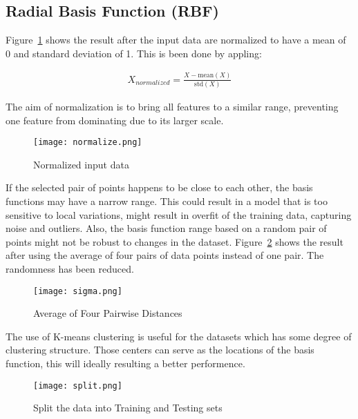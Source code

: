 \documentclass[10pt]{article}
\newcommand{\figsquish}{\vspace{-5mm}} %
\begin{document}
\begin{multicols*}{2}

\section{Radial Basis Function (RBF)}

Figure~\ref*{fig:normalize} shows the result after the input data are normalized to have a mean of 0 and standard deviation of 1.
This is been done by appling: 

\figsquish
\begin{gather*}
    X_{normalized} = \frac{X-\mathrm{mean} (X )}{\mathrm{std} (X)} 
\end{gather*}

The aim of normalization is to bring all features to a similar range, preventing one feature from dominating due to its larger scale. 

\figsquish
\begin{figure}[H]
    \centering
    \texttt{[image: normalize.png]}
    \caption{Normalized input data}
    \label{fig:normalize}
\end{figure}

If the selected pair of points happens to be close to each other, the basis functions may have a narrow range. This could result in a model that is too sensitive to local variations, might result in overfit of the training data,
capturing noise and outliers. 
Also, the basis function range based on a random pair of points might not be robust to changes in the dataset.
Figure~\ref*{fig:sigma} shows the result after using the average of four pairs of data points instead of one pair. The randomness has been reduced. 

\figsquish
\begin{figure}[H]
    \centering
    \texttt{[image: sigma.png]}
    \caption{Average of Four Pairwise Distances}
    \label{fig:sigma}
\end{figure}

The use of K-means clustering is useful for the datasets which has some degree of clustering structure. Those centers can serve as the locations of the basis function, 
this will ideally resulting a better performence. 

\figsquish
\begin{figure}[H]
    \centering
    \texttt{[image: split.png]}
    \caption{Split the data into Training and Testing sets}
    \label{fig:split}
\end{figure}


\end{multicols*}
\end{document}
